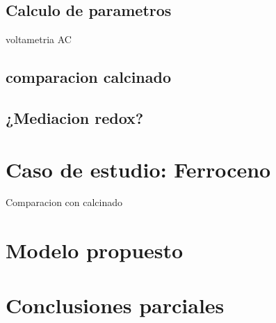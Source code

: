 	
	\subsection{Calculo de parametros}

	voltametria AC

	\subsection{comparacion calcinado}

	\subsection{¿Mediacion redox?}

	\section{Caso de estudio: Ferroceno}

	Comparacion con calcinado



\section{Modelo propuesto}

\section{Conclusiones parciales}





